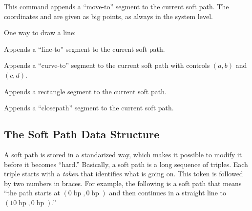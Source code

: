 \begin{command}{\pgfsyssoftpath@moveto{}}
  This command appends a ``move-to'' segment to the current soft
  path. The coordinates  and  are given as big points,
  as always in the system level.

  \example One way to draw a line:
\begin{codeexample}
\pgfsyssoftpath@flushcurrentpath
\pgfsys@stroke
\end{codeexample}
\end{command}

\begin{command}{\pgfsyssoftpath@lineto{}}
  Appends a ``line-to'' segment to the current soft path. 
\end{command}

\begin{command}{\pgfsyssoftpath@curevto{}}
  Appends a ``curve-to'' segment to the current soft path with controls
  $(a,b)$ and $(c,d)$.
\end{command}

\begin{command}{\pgfsyssoftpath@rect{}}
  Appends a rectangle segment to the current soft path. 
\end{command}

\begin{command}{\pgfsyssoftpath@closepath}
  Appends a ``closepath'' segment to the current soft path. 
\end{command}




\subsection{The Soft Path Data Structure}

A soft path is stored in a standarized way, which makes it possible to
modify it before it becomes ``hard.'' Basically, a soft path is a long
sequence of triples. Each triple starts with a \emph{token} that
identifies what is going on. This token is followed by two numbers in
braces. For example, the following is a soft path that means ``the
path starts at $(0\operatorname{bp}, 0\operatorname{bp})$ and then
continues in a straight line to $(10\operatorname{bp},
0\operatorname{bp})$.''

\begin{codeexample}
\end{codeexample}

